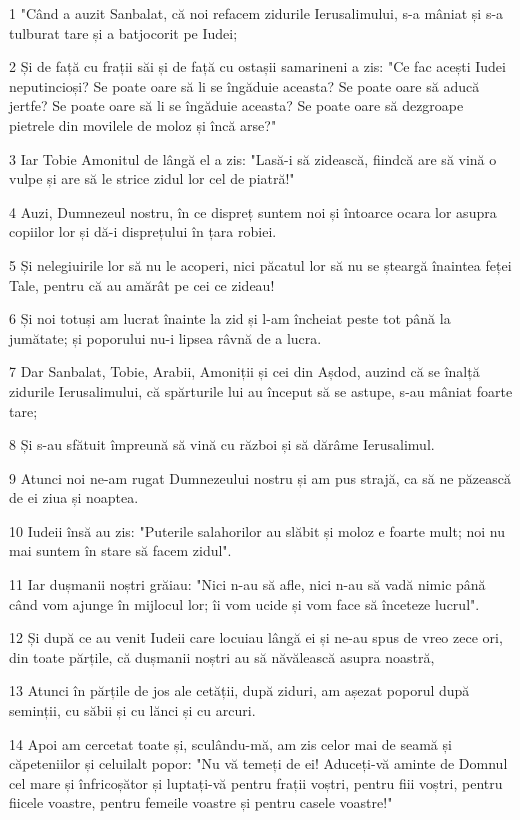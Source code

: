 \par 1 "Când a auzit Sanbalat, că noi refacem zidurile Ierusalimului, s-a mâniat și s-a tulburat tare și a batjocorit pe Iudei;
\par 2 Și de față cu frații săi și de față cu ostașii samarineni a zis: "Ce fac acești Iudei neputincioși? Se poate oare să li se îngăduie aceasta? Se poate oare să aducă jertfe? Se poate oare să li se îngăduie aceasta? Se poate oare să dezgroape pietrele din movilele de moloz și încă arse?"
\par 3 Iar Tobie Amonitul de lângă el a zis: "Lasă-i să zidească, fiindcă are să vină o vulpe și are să le strice zidul lor cel de piatră!"
\par 4 Auzi, Dumnezeul nostru, în ce dispreț suntem noi și întoarce ocara lor asupra copiilor lor și dă-i disprețului în țara robiei.
\par 5 Și nelegiuirile lor să nu le acoperi, nici păcatul lor să nu se șteargă înaintea feței Tale, pentru că au amărât pe cei ce zideau!
\par 6 Și noi totuși am lucrat înainte la zid și l-am încheiat peste tot până la jumătate; și poporului nu-i lipsea râvnă de a lucra.
\par 7 Dar Sanbalat, Tobie, Arabii, Amoniții și cei din Așdod, auzind că se înalță zidurile Ierusalimului, că spărturile lui au început să se astupe, s-au mâniat foarte tare;
\par 8 Și s-au sfătuit împreună să vină cu război și să dărâme Ierusalimul.
\par 9 Atunci noi ne-am rugat Dumnezeului nostru și am pus strajă, ca să ne păzească de ei ziua și noaptea.
\par 10 Iudeii însă au zis: "Puterile salahorilor au slăbit și moloz e foarte mult; noi nu mai suntem în stare să facem zidul".
\par 11 Iar dușmanii noștri grăiau: "Nici n-au să afle, nici n-au să vadă nimic până când vom ajunge în mijlocul lor; îi vom ucide și vom face să înceteze lucrul".
\par 12 Și după ce au venit Iudeii care locuiau lângă ei și ne-au spus de vreo zece ori, din toate părțile, că dușmanii noștri au să năvălească asupra noastră,
\par 13 Atunci în părțile de jos ale cetății, după ziduri, am așezat poporul după seminții, cu săbii și cu lănci și cu arcuri.
\par 14 Apoi am cercetat toate și, sculându-mă, am zis celor mai de seamă și căpeteniilor și celuilalt popor: "Nu vă temeți de ei! Aduceți-vă aminte de Domnul cel mare și înfricoșător și luptați-vă pentru frații voștri, pentru fiii voștri, pentru fiicele voastre, pentru femeile voastre și pentru casele voastre!"
